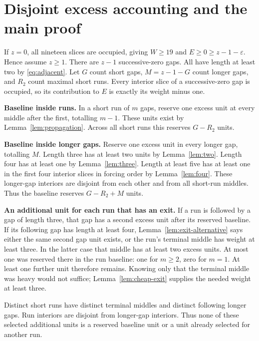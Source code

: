 \documentclass{article}
\begin{document}
\section{Disjoint excess accounting and the main proof}\label{sec:accounting}

If \(z = 0\), all nineteen slices are occupied, giving \(W \ge 19\) and
\(E \ge 0 \ge z - 1 - \varepsilon\). Hence assume \(z \ge 1\). There are \(z - 1\)
successive-zero gaps. All have length at least two by \eqref{eq:adjacent}. Let \(G\) count short
gaps, \(M = z - 1 - G\) count longer gaps, and \(R_2\) count maximal short runs. Every interior
slice of a successive-zero gap is occupied, so its contribution to \(E\) is exactly its weight
minus one.

\textbf{Baseline inside runs.} In a short run of \(m\) gaps, reserve one excess unit at every
middle after the first, totalling \(m - 1\). These units exist by Lemma~\ref{lem:propagation}.
Across all short runs this reserves \(G - R_2\) units.

\textbf{Baseline inside longer gaps.} Reserve one excess unit in every longer gap, totalling
\(M\). Length three has at least two units by Lemma~\ref{lem:two}. Length four has at least one
by Lemma~\ref{lem:three}. Length at least five has at least one in the first four interior slices
in forcing order by Lemma~\ref{lem:four}. These longer-gap interiors are disjoint from each other
and from all short-run middles. Thus the baseline reserves \(G - R_2 + M\) units.

\textbf{An additional unit for each run that has an exit.} If a run is followed by a gap of length
three, that gap has a second excess unit after its reserved baseline. If its following gap has
length at least four, Lemma~\ref{lem:exit-alternative} says either the same second gap unit
exists, or the run's terminal middle has weight at least three. In the latter case that middle
has at least two excess units. At most one was reserved there in the run baseline: one for
\(m \ge 2\), zero for \(m = 1\). At least one further unit therefore remains. Knowing only that
the terminal middle was heavy would not suffice; Lemma~\ref{lem:cheap-exit} supplies the needed
weight at least three.

Distinct short runs have distinct terminal middles and distinct following longer gaps. Run
interiors are disjoint from longer-gap interiors. Thus none of these selected additional units is
a reserved baseline unit or a unit already selected for another run.
\end{document}
